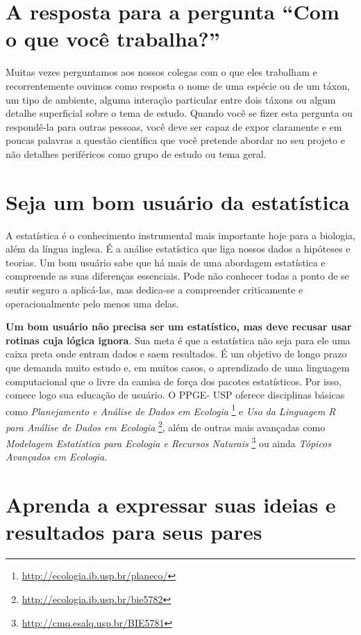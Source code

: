\documentclass[twoside a4paper 12pt]{report}
\begin{document}
\section{A resposta para a pergunta “Com o que você trabalha?”}

Muitas vezes perguntamos aos nossos colegas com o que eles trabalham e recorrentemente ouvimos como resposta o nome de uma espécie ou de um táxon, um tipo de ambiente, alguma interação particular entre dois táxons ou algum detalhe superficial sobre o tema de estudo. Quando você se fizer esta pergunta ou respondê-la para outras pessoas, você deve ser capaz de expor claramente e em poucas palavras a questão científica que você pretende abordar no seu projeto e não detalhes periféricos como grupo de estudo ou tema geral.

\section{Seja um bom usuário da estatística}

A estatística é o conhecimento instrumental mais importante hoje para a biologia, além da língua inglesa. É a análise estatística que liga nossos dados a hipóteses e teorias. Um bom usuário sabe que há mais de uma abordagem estatística e compreende as suas diferenças essenciais. Pode não conhecer todas a ponto de se sentir seguro a aplicá-las, mas dedica-se a compreender criticamente e operacionalmente pelo menos uma delas. 

\textbf{Um bom usuário não precisa ser um estatístico, mas deve recusar usar rotinas cuja lógica ignora}. Sua meta é que a estatística não seja para ele uma caixa preta onde entram dados e saem resultados. É um objetivo de longo prazo que demanda muito estudo e, em muitos casos, o aprendizado de uma linguagem computacional que o livre da camisa de força dos pacotes estatísticos. Por isso, comece logo sua educação de usuário. O PPGE- USP oferece disciplinas básicas como \emph{Planejamento e Análise de Dados em Ecologia} \footnote{\url{http://ecologia.ib.usp.br/planeco/}} e \emph{Uso da Linguagem R para Análise de Dados em Ecologia} \footnote{\url{http://ecologia.ib.usp.br/bie5782}}, além de outras mais avançadas como \emph{Modelagem Estatística para Ecologia e Recursos Naturais} \footnote{\url{http://cmq.esalq.usp.br/BIE5781}} ou ainda \emph{Tópicos Avançados em Ecologia}.

\section{Aprenda a expressar suas ideias e resultados para seus pares}
\end{document}

